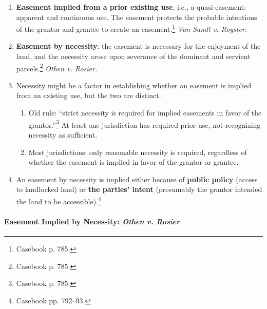 \begin{enumerate}
    \item \textbf{Easement implied from a prior existing use}, i.e., a 
    quasi-easement: apparent and continuous use. The easement protects the 
    probable intentions of the grantor and grantee to create an 
    easement.\footnote{Casebook p. 785.} \emph{Van Sandt v. Royster.}
    \item \textbf{Easement by necessity}: the easement is necessary for the 
    enjoyment of the land, and the necessity arose upon severance of the 
    dominant and servient parcels.\footnote{Casebook p. 785.} \emph{Othen v. 
    Rosier.}
    \item Necessity might be a factor in establishing whether an easement is 
    implied from an existing use, but the two are distinct.
    \begin{enumerate}
        \item Old rule: ``strict necessity is required for implied easements 
        in favor of the grantor.''\footnote{Casebook p. 785.} At least one 
        jurisdiction has required prior use, not recognizing necessity as 
        sufficient.
        \item Most jurisdictions: only reasonable necessity is required, 
        regardless of whether the easement is implied in favor of the grantor 
        or grantee.
    \end{enumerate}
    \item An easement by necessity is implied either because of \textbf{public 
    policy} (access to landlocked land) or \textbf{the parties' intent} 
    (presumably the grantor intended the land to be 
    accessible).\footnote{Casebook pp. 792--93.}
\end{enumerate}

\paragraph{Easement Implied by Necessity: \emph{Othen v. Rosier}}

